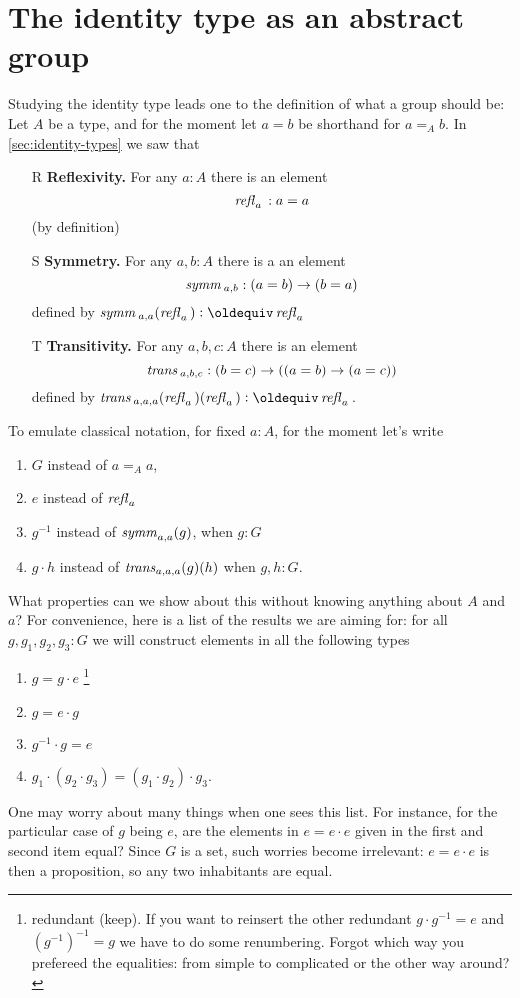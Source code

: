 \section{The identity type as an abstract group }
\label{sec:identity-type-as-abstract}

Studying the identity type leads one to the definition of what a group should be:
Let $A$ be a type, and for the moment let $a=b$ be shorthand for $a=_Ab$.  In \cref{sec:identity-types} we saw that
\begin{enumerate}
\item[R] {\bf Reflexivity.} For any $a:A$ there is an element
$$\mathop{{\it refl}_{a}}{}:a=a$$ (by definition)
\item[S] {\bf Symmetry.} For any $a,b:A$ there is a an element $$\mathop{\mathit{symm}}{}_{a,b}:(a=b)\to (b=a)$$ defined by $\symm{}_{a,a}(\refl a{})\defequi\refl a{}$
\item[T] {\bf Transitivity.} For any $a,b,c:A$ there is an element $$\mathop{\mathit{trans}}{}_{a,b,c}:(b=c)\to((a=b)\to(a=c))$$ defined by $\trans{}_{a,a,a}(\refl a{})(\refl a{})\defequi \refl a{}$.
\end{enumerate}

 To emulate classical notation, for fixed $a:A$,  for the moment let's write
 \begin{enumerate}
 \item $G$ instead of $a=_Aa$,
 \item $e$ instead of $\mathop{{\it refl}_{a}}{}$
 \item $g^{-1}$ instead of $\mathop{\mathit{symm}}_{a,a}(g)$, when $g:G$
 \item $g\cdot h$ instead of $\mathop{\mathit{trans}}_{a,a,a}(g)(h)$ when $g,h:G$.
 \end{enumerate}
 What properties can we show about this without knowing anything about $A$ and $a$? For convenience, here is a list of the results we are aiming for: for all $g,g_1,g_2,g_3:G$ we will construct elements in all the following types
 \begin{enumerate}
 \item $g=g\cdot e$ \footnote{redundant (keep).  If you want to reinsert the other redundant $g\cdot g^{-1}=e$ and $(g^{-1})^{-1}=g$ we have to do some renumbering.  Forgot which way you prefereed the equalities: from simple to complicated or the other way around?}
 \item $g=e\cdot g$
 \item $g^{-1}\cdot g=e$
 \item $g_1\cdot(g_2\cdot g_3)=(g_1\cdot g_2)\cdot g_3$.
 \end{enumerate}
 \begin{remark}
   One may worry about many things when one sees this list.  For instance, for the particular case of $g$ being $e$, are the elements in $e=e\cdot e$ given in the first and second item equal?  Since $G$ is a set, such worries become irrelevant: $e=e\cdot e$ is then a proposition, so any two inhabitants are equal.
 \end{remark}

